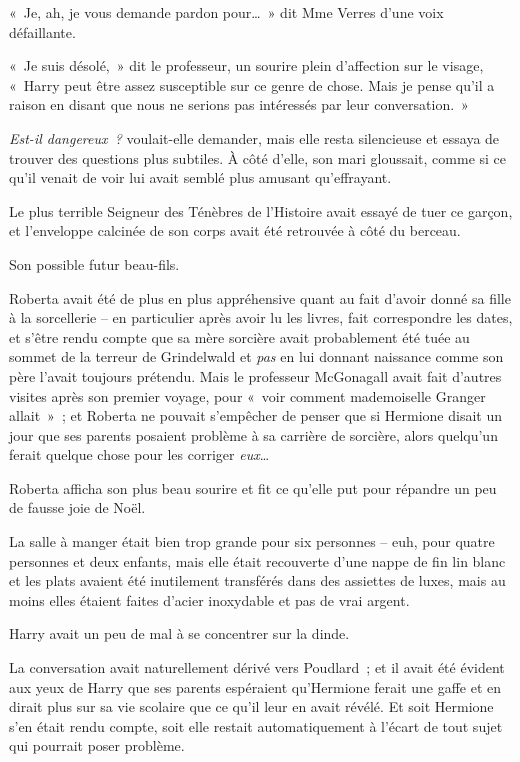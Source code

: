 «~Je, ah, je vous demande pardon pour…~»
dit Mme Verres d'une voix défaillante.

«~Je suis désolé,~» dit le professeur, un sourire plein d'affection sur le visage, «~Harry peut être assez susceptible sur ce genre de chose.
Mais je pense qu'il a raison en disant que nous ne serions pas intéressés par leur conversation.~»

\emph{Est-il dangereux~?} voulait-elle demander, mais elle resta silencieuse et essaya de trouver des questions plus subtiles.
À côté d'elle, son mari gloussait, comme si ce qu'il venait de voir lui avait semblé plus amusant qu'effrayant.

Le plus terrible Seigneur des Ténèbres de l'Histoire avait essayé de tuer ce garçon, et l'enveloppe calcinée de son corps avait été retrouvée à côté du berceau.

Son possible futur beau-fils.

Roberta avait été de plus en plus appréhensive quant au fait d'avoir donné sa fille à la sorcellerie -- en particulier après avoir lu les livres, fait correspondre les dates, et s'être rendu compte que sa mère sorcière avait probablement été tuée au sommet de la terreur de Grindelwald et \emph{pas} en lui donnant naissance comme son père l'avait toujours prétendu.
Mais le professeur McGonagall avait fait d'autres visites après son premier voyage, pour «~voir comment mademoiselle Granger allait~»~; et Roberta ne pouvait s'empêcher de penser que si Hermione disait un jour que ses parents posaient problème à sa carrière de sorcière, alors quelqu'un ferait quelque chose pour les corriger \emph{eux}…

Roberta afficha son plus beau sourire et fit ce qu'elle put pour répandre un peu de fausse joie de Noël.

\later

La salle à manger était bien trop grande pour six personnes -- euh, pour quatre personnes et deux enfants, mais elle était recouverte d'une nappe de fin lin blanc et les plats avaient été inutilement transférés dans des assiettes de luxes, mais au moins elles étaient faites d'acier inoxydable et pas de vrai argent.

Harry avait un peu de mal à se concentrer sur la dinde.

La conversation avait naturellement dérivé vers Poudlard~; et il avait été évident aux yeux de Harry que ses parents espéraient qu'Hermione ferait une gaffe et en dirait plus sur sa vie scolaire que ce qu'il leur en avait révélé.
Et soit Hermione s'en était rendu compte, soit elle restait automatiquement à l'écart de tout sujet qui pourrait poser problème.

